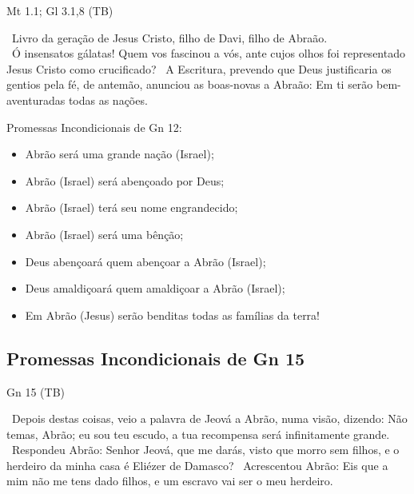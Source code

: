 \documentclass[12pt,aspectratio=169]{beamer}
\newcommand{\ver}[1]{%
    \raisebox{0.50ex}{%
        \scalebox{1.1}{%
            \pmb{\textbf{\textcolor{BSpbg}{#1}}}%
        }%
    }%
}
\newcommand{\QUOTE}[1]{%
    \par\noindent\hspace*{0.05\linewidth}%
    \begin{minipage}{0.9\linewidth}%
        \linespread{1.35}\large{#1}%
    \end{minipage}%
}
\newcommand{\RED}[1]{{\textcolor{TXred}{#1}}}
\newcommand{\YEL}[1]{{\textcolor{TXyel}{#1}}}
\newcommand{\GRE}[1]{{\textcolor{TXgre}{#1}}}
\newcommand{\MAG}[1]{{\textcolor{TXmag}{#1}}}
\newcommand{\BRI}[1]{{\textcolor{BSpbg}{#1}}}   %
\begin{document}
    \begin{frame}{Mt 1.1; Gl 3.1,8 (TB)}
        \QUOTE{%
            \ver{Mt 1.1}~Livro da geração de \MAG{Jesus Cristo}, filho de Davi, \YEL{filho de
            Abraão}.
            \\[\medskipamount]
            \ver{Gl 3.1}~Ó insensatos gálatas! Quem vos fascinou a vós, ante cujos olhos foi
            representado \MAG{Jesus Cristo} como crucificado?
            \ver{Gl 3.8}~A \YEL{Escritura}, \YEL{prevendo} que Deus justificaria os gentios pela
            fé, \YEL{de antemão, anunciou} as boas-novas a Abraão: \MAG{Em ti serão
            bem-aventuradas todas as nações}.
        }
    \end{frame}

    \begin{frame}{Promessas \YEL{Incondicionais} de \BRI{Gn 12}:}
        \begin{itemize}
            \item<1-> Abrão será uma \YEL{grande nação} (Israel);
            \item<2-> Abrão (Israel) será \YEL{abençoado por Deus};
            \item<3-> Abrão (Israel) terá seu \YEL{nome engrandecido};
            \item<4-> Abrão (Israel) será uma \YEL{bênção};
            \item<5-> Deus \GRE{abençoará quem abençoar} a Abrão (Israel);
            \item<6-> Deus \RED{amaldiçoará quem amaldiçoar} a Abrão (Israel);
            \item<7-> Em Abrão (Jesus) serão \MAG{benditas todas as famílias da terra}!
        \end{itemize}
    \end{frame}

    \subsection{Promessas \BRI{Incondicionais} de Gn 15}

    \begin{frame}{Gn 15 (TB)}
        \QUOTE{%
            \ver{1}~Depois destas coisas, veio a palavra de Jeová a Abrão, numa visão, dizendo:
            Não temas, Abrão; eu sou teu \YEL{escudo}, a tua \YEL{recompensa} será infinitamente
            grande.
            \ver{2}~Respondeu Abrão: Senhor Jeová, que me darás, visto que morro sem filhos, e o
            herdeiro da minha casa é Eliézer de Damasco?
            \ver{3}~Acrescentou Abrão: Eis que a mim não me tens dado filhos, e um escravo vai
            ser o meu herdeiro.
        }
    \end{frame}
\end{document}
